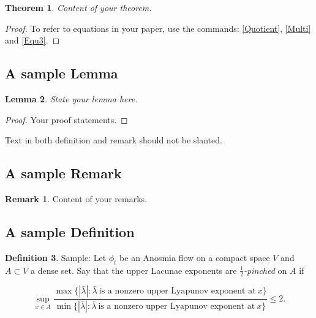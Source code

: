\documentclass{aims}
\newtheorem{theorem}{Theorem}[section]
\newtheorem{lemma}[theorem]{Lemma}
\theoremstyle{definition}
\newtheorem{definition}[theorem]{Definition}
\newtheorem{remark}{Remark}
\begin{document}
\begin{theorem} \label{result1}
        Content of your theorem.
\end{theorem}

\begin{proof}
To refer to equations in your paper, use the commands:
\ref{Quotient}, \ref{Multi} and \ref{Equ3}.
\end{proof}

\subsection{A sample Lemma}

\begin{lemma} \label{L: Lyapunov exponents} State your lemma here.
\end{lemma}

\begin{proof}
Your proof statements.
\end{proof}

Text in both definition and remark should not be slanted.
\subsection{A sample Remark}

\begin{remark}
Content of your remarks.
\end{remark}
\subsection{A sample Definition}

\begin{definition} Sample: Let $\phi_{t}$ be an Anosmia flow on a
        compact space $V$ and $A \subset V$ a dense set. Say
        that the upper Lacunae exponents are
        \emph{$\frac{1}{2}$-pinched} on $A$ if
\bigskip

  \begin{equation}\label{Quotient}
        \sup_{x \in A} \frac{\max \{ |\bar{\lambda}|: \bar{\lambda} \
        \text{is a nonzero upper Lyapunov exponent at} \ x \}}
        {\min \{ |\bar{\lambda}|: \bar{\lambda} \ \text{is a
        nonzero upper Lyapunov exponent at} \ x\}}
         \leq 2.
  \end{equation}
\end{definition}
\bigskip
\end{document}
